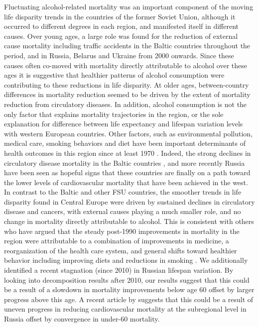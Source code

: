 \documentclass{article}
\begin{document}
\begin{spacing}{1.5}
Fluctuating alcohol-related mortality was an important component of the moving life disparity trends in the countries of the former Soviet Union, although it occurred to different degrees in each region, and manifested itself in different causes. Over young ages, a large role was found for the reduction of external cause mortality including traffic accidents in the Baltic countries throughout the period, and in Russia, Belarus and Ukraine from 2000 onwards. Since these causes often co-moved with mortality directly attributable to alcohol over these ages it is suggestive that healthier patterns of alcohol consumption were contributing to these reductions in life disparity. At older ages, between-country differences in mortality reduction seemed to be driven by the extent of mortality reduction from circulatory diseases. In addition, alcohol consumption is not the only factor that explains mortality trajectories in the region, or the sole explanation for difference between life expectancy and lifespan variation levels with western European countries. Other factors, such as environmental pollution, medical care, smoking behaviors and diet have been important determinants of health outcomes in this region since at least 1970 \citep{bobak1996east}. Indeed, the strong declines in circulatory disease mortality in the Baltic countries \citep{jasilionis2011}, and more recently Russia \citep{grigoriev2014recent} have been seen as hopeful signs that these countries are finally on a path toward the lower levels of cardiovascular mortality that have been achieved in the west. \\

In contrast to the Baltic and other FSU countries, the smoother trends in life disparity found in Central Europe were driven by sustained declines in circulatory disease and cancers, with external causes playing a much smaller role, and no change in mortality directly attributable to alcohol. This is consistent with others who have argued that the steady post-1990 improvements in mortality in the region were attributable to a combination of improvements in medicine, a reorganization of the health care system, and general shifts toward healthier behavior including improving diets and reductions in smoking \citep{pajkak2011cardiovascular, zatonski1998ecological, Fihel2017, cifkova2010, cooper1984rising, rychtarikova2004,nolte2000changingb,nolte2000changing}. We additionally identified a recent stagnation (since 2010) in Russian lifespan variation. By looking into decomposition results after 2010, our results suggest that this could be a result of a slowdown in mortality improvements below age 60 offset by larger progress above this age. A recent article by \cite{Timonin2017} suggests that this could be a result of uneven progress in reducing cardiovascular mortality at the subregional level in Russia offset by convergence in under-60 mortality. \\ 


\end{spacing}
\end{document}
